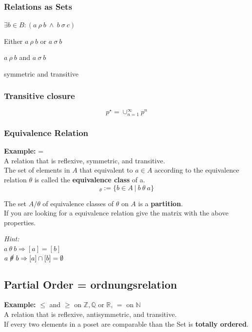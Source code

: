 \documentclass[11pt]{article}
\begin{document}
\subsubsection{Relations as Sets}

\begin{description}[labelindent=16pt,style=multiline,leftmargin=4.5cm, noitemsep]
	\item[$a\ \rho\sigma\ b$:] $\exists b\in B: (a\ \rho\ b\ \land\ b\ \sigma\ c)$
	\item[$a\ (\rho\cup\sigma)\ b$:] Either $a\ \rho\ b$ or $a\ \sigma\ b$
	\item[$a\ (\rho\cap\sigma)\ b$:] $a\ \rho\ b$ and $a\ \sigma\ b$
	\item[The empty set $\emptyset$:] symmetric and transitive
\end{description}
\subsubsection{Transitive closure}
\begin{equation}
	p^\star = \cup^\infty_{n=1}p^n
\end{equation}

\subsubsection{Equivalence Relation}
\textbf{Example:} = \\ 
A relation that is reflexive, symmetric, and transitive.\\

The set of elements in $A$ that equivalent to $a \in A$ according to the equivalence relation $\theta$ is called the \textbf{equivalence class} of a.
\begin{equation*}
	[a]_\theta := \{b \in A\ |\ b\ \theta\ a \}
\end{equation*}

The set $A/\theta$ of equivalence classes of $\theta$ on $A$ is a \textbf{partition}. \\
If you are looking for a equivalence relation give the matrix with the above properties.

\emph{Hint:}\\
$a\ \theta\ b \Rightarrow [a] = [b]$\\
$a\ \cancel{\theta}\ b \Rightarrow [a] \cap [b] = \emptyset$

\subsection{Partial Order = ordnungsrelation}
\textbf{Example:} $\leq$ and $\geq$ on $\mathbb{Z}, \mathbb{Q}$ or $\mathbb{R}$, $=$ on $\mathbb{N}$\\ 
A relation that is reflexive, antisymmetric, and transitive. \\
If every two elements in a poset are comparable than the Set is \textbf{totally ordered}.\\
\end{document}
